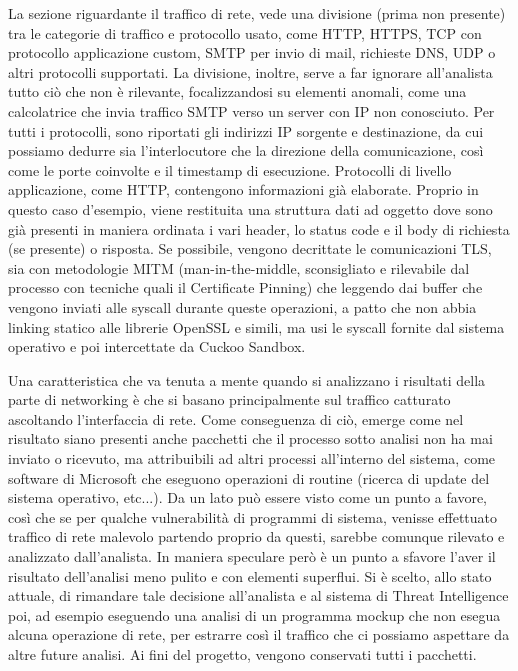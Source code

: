 La sezione riguardante il traffico di rete, vede una divisione (prima non presente) tra le categorie di traffico e protocollo usato, come HTTP, HTTPS, TCP con protocollo applicazione custom, SMTP per invio di mail, richieste DNS, UDP o altri protocolli supportati. La divisione, inoltre, serve a far ignorare all'analista tutto ciò che non è rilevante, focalizzandosi su elementi anomali, come una calcolatrice che invia traffico SMTP verso un server con IP non conosciuto.
Per tutti i protocolli, sono riportati gli indirizzi IP sorgente e destinazione, da cui possiamo dedurre sia l'interlocutore che la direzione della comunicazione, così come le porte coinvolte e il timestamp di esecuzione.
Protocolli di livello applicazione, come HTTP, contengono informazioni già elaborate.
Proprio in questo caso d'esempio, viene restituita una struttura dati ad oggetto dove sono già presenti in maniera ordinata i vari header, lo status code e il body di richiesta (se presente) o risposta.
Se possibile, vengono decrittate le comunicazioni TLS, sia con metodologie MITM (man-in-the-middle, sconsigliato e rilevabile dal processo con tecniche quali il Certificate Pinning) che leggendo dai buffer che vengono inviati alle syscall durante queste operazioni, a patto che non abbia linking statico alle librerie OpenSSL e simili, ma usi le syscall fornite dal sistema operativo e poi intercettate da Cuckoo Sandbox.

Una caratteristica che va tenuta a mente quando si analizzano i risultati della parte di networking è che si basano principalmente sul traffico catturato ascoltando l'interfaccia di rete. Come conseguenza di ciò, emerge come nel risultato siano presenti anche pacchetti che il processo sotto analisi non ha mai inviato o ricevuto, ma attribuibili ad altri processi all'interno del sistema, come software di Microsoft che eseguono operazioni di routine (ricerca di update del sistema operativo, etc...).
Da un lato può essere visto come un punto a favore, così che se per qualche vulnerabilità di programmi di sistema, venisse effettuato traffico di rete malevolo partendo proprio da questi, sarebbe comunque rilevato e analizzato dall'analista. In maniera speculare però è un punto a sfavore l'aver il risultato dell'analisi meno pulito e con elementi superflui.
Si è scelto, allo stato attuale, di rimandare tale decisione all'analista e al sistema di Threat Intelligence poi, ad esempio eseguendo una analisi di un programma mockup che non esegua alcuna operazione di rete, per estrarre così il traffico che ci possiamo aspettare da altre future analisi. Ai fini del progetto, vengono conservati tutti i pacchetti.

